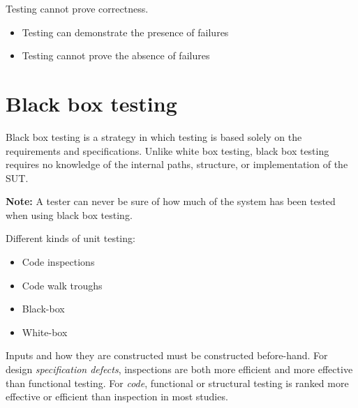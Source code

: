 \documentclass[a4paper]{article}
\begin{document}
Testing cannot prove correctness.
\begin{itemize}
\item Testing can demonstrate the presence of failures
\item Testing cannot prove the absence of failures
\end{itemize}


\section{Black box testing}
Black box testing is a strategy in which testing is based solely on the
requirements and specifications. Unlike white box testing, black box testing
requires no knowledge of the internal paths, structure, or implementation of the
SUT.
\begin{framed}
  \noindent\textbf{Note:} A tester can never be sure of how much of the system has been tested when
  using black box testing.
\end{framed}

Different kinds of unit testing:
\begin{itemize}
  \item Code inspections
  \item Code walk troughs
  \item Black-box
  \item White-box
\end{itemize}
Inputs and how they are constructed must be constructed before-hand.
For design \textit{specification defects}, inspections are both more efficient and more
effective than functional testing. For \textit{code}, functional or structural
testing is ranked more effective or efficient than inspection in most studies.
\end{document}
